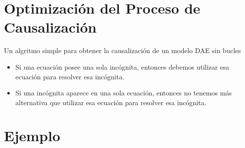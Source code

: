 \section{Optimización del Proceso de Causalización}

\begin{frame}{Un algritmo simple para obtener la causalización de un modelo DAE sin bucles}
    \begin{itemize}
        \item Si una ecuación posee una sola incógnita, entonces debemos utilizar esa ecuación para resolver esa incógnita.
        \item Si una incógnita aparece en una sola ecuación, entonces no tenemos más alternativa que utilizar esa ecuación para resolver esa incógnita.
    \end{itemize}
\end{frame}

\begin{frame}
\end{frame}

\section{Ejemplo}

